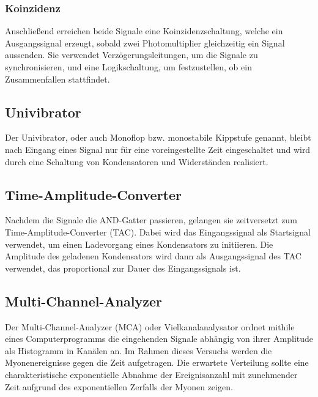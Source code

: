\subsubsection*{Koinzidenz}
Anschließend erreichen beide Signale eine Koinzidenzschaltung, welche ein Ausgangssignal
erzeugt, sobald zwei Photomultiplier gleichzeitig ein Signal aussenden.
Sie verwendet Verzögerungsleitungen, um die Signale zu synchronisieren, und eine Logikschaltung, 
um festzustellen, ob ein Zusammenfallen stattfindet.

\subsection*{Univibrator}
Der Univibrator, oder auch Monoflop bzw. monostabile Kippstufe genannt,
bleibt nach Eingang eines Signal nur für eine voreingestellte Zeit eingeschaltet
und wird durch eine Schaltung von Kondensatoren und Widerständen realisiert.

\subsection*{Time-Amplitude-Converter}
Nachdem die Signale die AND-Gatter passieren, 
gelangen sie zeitversetzt zum Time-Amplitude-Converter (TAC).
Dabei wird das Eingangssignal als Startsignal verwendet, 
um einen Ladevorgang eines Kondensators zu initiieren. 
Die Amplitude des geladenen Kondensators wird dann als Ausgangssignal des TAC verwendet, 
das proportional zur Dauer des Eingangssignals ist.

\subsection*{Multi-Channel-Analyzer}
Der Multi-Channel-Analyzer (MCA) oder Vielkanalanalysator ordnet mithile eines Computerprogramms 
die eingehenden Signale abhängig von ihrer Amplitude als Histogramm in Kanälen an.
Im Rahmen dieses Versuchs werden die Myonenereignisse gegen die Zeit aufgetragen.
Die erwartete Verteilung sollte eine charakteristische exponentielle Abnahme der Ereignisanzahl mit 
zunehmender Zeit aufgrund des exponentiellen Zerfalls der Myonen zeigen.